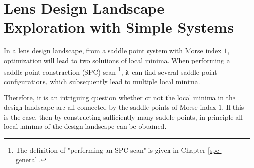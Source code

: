\setlength{\parskip}{.2em}
\graphicspath{ {./chapter-3/figures/} }
\captionsetup[figure]{labelfont=bf}
\captionsetup{margin=1.5em}
\captionsetup[table]{labelfont=bf}


\chapter{Lens Design Landscape Exploration with Simple Systems}
\label{chapter_SPC_simple_system_landscape}







\noindent 
In a lens design landscape, from a saddle point system with Morse index $1$, optimization will lead to two solutions of local minima.  When performing a saddle point construction (SPC) scan \footnote{The definition of "performing an SPC scan" is given in Chapter \ref{spc-general}.}, it can find several saddle point configurations, which subsequently lead to multiple local minima. 

Therefore, it is an intriguing question whether or not the local minima in the design landscape are all connected by the saddle points of Morse index $1$. If this is the case, then by constructing sufficiently many saddle points, in principle all local minima of the design landscape can be obtained. 

